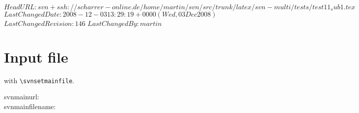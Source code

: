 \svnidlong
{$HeadURL: svn+ssh://scharrer-online.de/home/martin/svn/src/trunk/latex/svn-multi/tests/test11_sub1.tex $}
{$LastChangedDate: 2008-12-03 13:29:19 +0000 (Wed, 03 Dec 2008) $}
{$LastChangedRevision: 146 $}
{$LastChangedBy: martin $}

\noindent

\section{Input file}
with \verb+\svnsetmainfile+.
\svnsetmainfile

svnmainurl: \svnnolinkurl{\svnmainurl} \\
svnmainfilename: \svnnolinkurl{\svnmainfilename} \\

